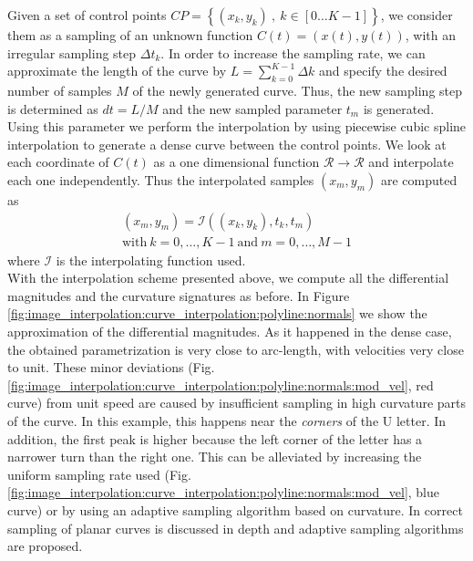 \documentclass{ipol}
\begin{document}
Given a set of control points $CP=\left\{(x_k,y_k) \: , \: k \in [0 \ldots K-1]\right\}$, we consider them as a sampling of an unknown function $C(t)=(x(t),y(t))$, with an irregular sampling step $\Delta t_k$. In order to increase the sampling rate, we can approximate the length of the curve by $L=\sum_{k=0}^{K-1} \Delta k$ and specify the desired number of samples $M$ of the newly generated curve. Thus, the new sampling step is determined as $dt=L/M$ and the new sampled parameter $t_m$ is generated. Using this parameter we perform the interpolation by
using piecewise cubic spline interpolation to generate a dense curve between the control points. We look at each coordinate of $C(t)$ as a one dimensional function $\mathcal{R}\rightarrow\mathcal{R}$ and interpolate each one independently. Thus the interpolated samples $(x_m,y_m)$ are computed as
\begin{equation}
\begin{array}{l}
 (x_m,y_m)=\mathcal{I}((x_k,y_k),t_k,t_m) \\
 \mbox{with} \: k=0,\ldots,K-1 \: \mbox{and} \: m=0,\ldots,M-1
 \end{array}
\end{equation}
where  $\mathcal{I}$  is the interpolating function used.\\
With the interpolation scheme presented above, we compute all the differential magnitudes and the curvature signatures as before. In Figure \ref{fig:image_interpolation:curve_interpolation:polyline:normals} we show the approximation of the differential magnitudes. As it happened in the dense case, the obtained parametrization is very close to arc-length, with velocities very close to unit. These minor deviations (Fig. \ref{fig:image_interpolation:curve_interpolation:polyline:normals:mod_vel}, red curve) from unit speed are caused by insufficient sampling in high curvature parts of the curve. In this example, this happens near the \emph{corners} of the U letter. In addition, the first peak is higher because the left corner of the letter has a narrower turn than the right one.
This can be alleviated by increasing the uniform sampling rate used (Fig. \ref{fig:image_interpolation:curve_interpolation:polyline:normals:mod_vel}, blue curve) or by using an adaptive sampling algorithm based on curvature. In  \cite{geometry:curves:surazhsky:2004:sampling_planar_curves} correct sampling of planar curves is discussed in depth and adaptive sampling algorithms are proposed.
\end{document}
